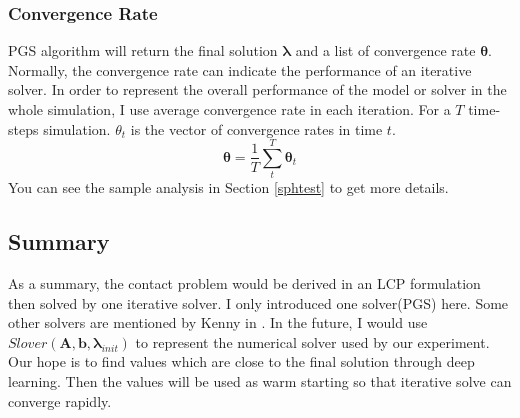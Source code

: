     \subsubsection{Convergence Rate}
    PGS algorithm will return the final solution \(\pmb{\lambda}\) and a list of convergence rate $\pmb{\theta}$. Normally, the convergence rate can indicate the performance of an iterative solver. In order to represent the overall performance of the model or solver in the whole simulation, I use average convergence rate in each iteration. For a $T$ time-steps simulation. $\theta_{t}$ is the vector of convergence rates in time $t$.
    \begin{equation}
        \pmb{\theta} = \frac{1}{T}\sum_{t}^{T}\pmb{\theta}_t
    \end{equation} 
    You can see the sample analysis in Section \ref{sphtest} to get more details.

    \subsection{Summary}
    As a summary, the contact problem would be derived in an LCP formulation then solved by one iterative solver. I only introduced one solver(PGS) here. Some other solvers are mentioned by Kenny in \cite{Erleben:2007:VSP:1243980.1243986, poulsen2010heuristic}. In the future, I would use $Slover(\pmb{A}, \pmb{b}, \pmb{\lambda}_{init})$ to represent the numerical solver used by our experiment. Our hope is to find values which are close to the final solution through deep learning. Then the values will be used as warm starting so that iterative solve can converge rapidly.